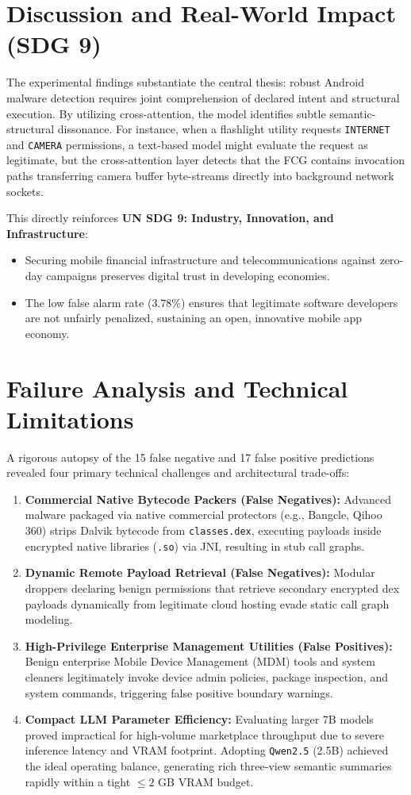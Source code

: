 \documentclass[12pt,a4paper,oneside]{report}
\begin{document}
\section{Discussion and Real-World Impact (SDG 9)}
The experimental findings substantiate the central thesis: robust Android malware detection requires joint comprehension of declared intent and structural execution. 
By utilizing cross-attention, the model identifies subtle semantic-structural dissonance. For instance, when a flashlight utility requests \texttt{INTERNET} and \texttt{CAMERA} permissions, a text-based model might evaluate the request as legitimate, but the cross-attention layer detects that the FCG contains invocation paths transferring camera buffer byte-streams directly into background network sockets.

This directly reinforces \textbf{UN SDG 9: Industry, Innovation, and Infrastructure}:
\begin{itemize}
    \item Securing mobile financial infrastructure and telecommunications against zero-day campaigns preserves digital trust in developing economies.
    \item The low false alarm rate ($3.78\%$) ensures that legitimate software developers are not unfairly penalized, sustaining an open, innovative mobile app economy.
\end{itemize}

\section{Failure Analysis and Technical Limitations}
A rigorous autopsy of the 15 false negative and 17 false positive predictions revealed four primary technical challenges and architectural trade-offs:
\begin{enumerate}
    \item \textbf{Commercial Native Bytecode Packers (False Negatives):} Advanced malware packaged via native commercial protectors (e.g., Bangcle, Qihoo 360) strips Dalvik bytecode from \texttt{classes.dex}, executing payloads inside encrypted native libraries (\texttt{.so}) via JNI, resulting in stub call graphs.
    \item \textbf{Dynamic Remote Payload Retrieval (False Negatives):} Modular droppers declaring benign permissions that retrieve secondary encrypted dex payloads dynamically from legitimate cloud hosting evade static call graph modeling.
    \item \textbf{High-Privilege Enterprise Management Utilities (False Positives):} Benign enterprise Mobile Device Management (MDM) tools and system cleaners legitimately invoke device admin policies, package inspection, and system commands, triggering false positive boundary warnings.
    \item \textbf{Compact LLM Parameter Efficiency:} Evaluating larger 7B models proved impractical for high-volume marketplace throughput due to severe inference latency and VRAM footprint. Adopting \texttt{Qwen2.5} (2.5B) achieved the ideal operating balance, generating rich three-view semantic summaries rapidly within a tight $\le 2$ GB VRAM budget.
\end{enumerate}
\end{document}
